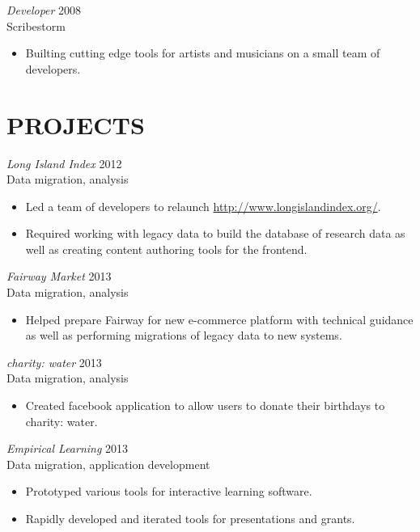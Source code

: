 \documentclass[line,margin]{res}
\begin{document}
\begin{resume}
    {\sl Developer}
    \hfill 2008 \\
    Scribestorm
    \begin{itemize}
        \item
            Builting cutting edge tools for artists and musicians on a small team
            of developers.
    \end{itemize}

\section{PROJECTS}
    {\sl Long Island Index}
    \hfill 2012 \\
    Data migration, analysis
    \begin{itemize} \itemsep -2pt
        \item
            Led a team of developers to relaunch \url{http://www.longislandindex.org/}.
        \item
            Required working with legacy data to build the database of research data as
            well as creating content authoring tools for the frontend.
    \end{itemize}

    {\sl Fairway Market}
    \hfill 2013 \\
    Data migration, analysis
    \begin{itemize} \itemsep -2pt
        \item
            Helped prepare Fairway for new e-commerce platform with technical guidance as well as
            performing migrations of legacy data to new systems.
    \end{itemize}

    {\sl charity: water}
    \hfill 2013 \\
    Data migration, analysis
    \begin{itemize} \itemsep -2pt
        \item
            Created facebook application to allow users to donate their birthdays to charity: water.
    \end{itemize}

    \begin{samepage}
    {\sl Empirical Learning}
    \hfill 2013 \\
    Data migration, application development
    \begin{itemize} \itemsep -2pt
        \item
            Prototyped various tools for interactive learning software.
        \item
            Rapidly developed and iterated tools for presentations and grants.
    \end{itemize}
    \end{samepage}


\end{resume}
\end{document}
